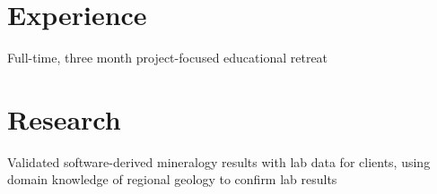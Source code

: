\documentclass[letterpaper]{deedy-resume} %
\begin{document}
\begin{minipage}[t]{0.66\textwidth} %


\section{Experience}


\vspace{\topsep} %
\begin{tightitemize}
\item Full-time, three month project-focused educational retreat  \\
\end{tightitemize}

\sectionspace %

\section{Research}


\begin{tightitemize}
\item Validated software-derived mineralogy results with lab data for clients, using domain knowledge of regional geology to confirm lab results
\end{tightitemize}

\sectionspace %



\end{minipage}
\end{document}
